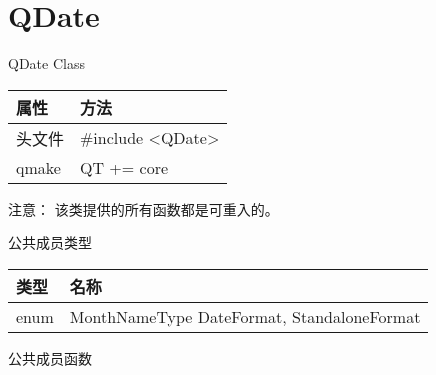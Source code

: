 \chapter{QDate}

QDate Class

\begin{tabular}{|l|l|}
\hline
属性&	方法\\
\hline
头文件&	\#include <QDate>\\
\hline
qmake&	QT += core\\
\hline
\end{tabular}

注意： 该类提供的所有函数都是可重入的。

\splitLine

公共成员类型

\begin{tabular}{|l|l|}
\hline
类型&	名称\\
\hline
enum&	MonthNameType{ DateFormat, StandaloneFormat }\\
\hline
\end{tabular}

\splitLine

公共成员函数

